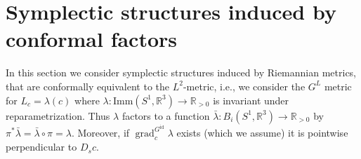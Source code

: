 \documentclass[12pt]{amsart}
\newcommand{\rev}[1]{#1}
\theoremstyle{definition}
\newcommand{\R}{\mathbb R}
\newcommand{\id}{\mathrm{id}}
\newcommand{\Imm}{\mathrm{Imm}}
\def\la{\lambda}
\def\Ga{\Gamma}
\def\Om{\Omega}
\def\o{\operatorname{\circ}}
\def\R{{\mathbb R}}
\let\on=\operatorname
\begin{document}

\section{Symplectic structures induced by conformal factors}\label{sec:conformal}
In this section we consider symplectic structures induced by Riemannian metrics, that are conformally equivalent to the $L^2$-metric, i.e.,  we consider the $G^L$ metric for $L_c=\la(c)$ where $\la\colon \Imm(S^1,\R^3)\to \R_{>0}$ is invariant under reparametrization. Thus $\la$  factors to a function $\bar \la\colon B_i(S^1,\R^3)\to \R_{>0}$ by $\pi^* \bar \la= \rev{\bar\la \o \pi =}\la $. Moreover, if $\on{grad}^{G^\id}_c\la$ exists (which we assume) it is pointwise perpendicular to $D_s c$.
\end{document}
